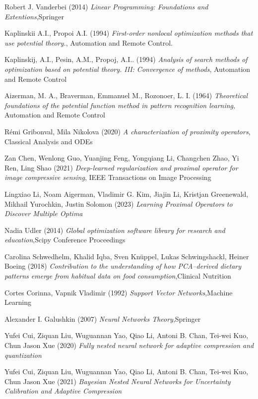 \documentclass{article} %
\begin{document}
 \begin{thebibliography}{9}
Robert J. Vanderbei (2014) \emph{ Linear Programming: Foundations and Extentions},Springer

Kaplinskii A.I., Propoi A.I. (1994) \emph{First-order nonlocal optimization methods that use potential theory.}, Automation and Remote Control. 

Kaplinskij, A.I., Pesin, A.M., Propoj, A.I.. (1994) \emph{  Analysis of search methods of optimization based on potential theory. III: Convergence of methods}, Automation and Remote Control

Aizerman, M. A., Braverman, Emmanuel M., Rozonoer, L. I. (1964) \emph{ Theoretical foundations of the potential function method in pattern recognition learning}, Automation and Remote Control

Rémi Gribonval, Mila Nikolova (2020) \emph{ A characterization of proximity operators}, Classical Analysis and ODEs

Zan Chen, Wenlong Guo, Yuanjing Feng, Yongqiang Li, Changchen Zhao, Yi Ren, Ling Shao (2021) \emph{ Deep-learned regularization and proximal operator for image compressive sensing}, IEEE Transactions on Image Processing

Lingxiao Li, Noam Aigerman, Vladimir G. Kim, Jiajin Li, Kristjan Greenewald, Mikhail Yurochkin, Justin Solomon (2023) \emph{ Learning Proximal Operators to Discover  Multiple Optima}


Nadia Udler (2014) \emph{ Global optimization software library for research and education},Scipy Conference Proceedings


Carolina Schwedhelm,  Khalid Iqba, Sven Knüppel,  Lukas Schwingshackl, Heiner Boeing (2018) \emph{ Contribution to the understanding of how PCA–derived dietary patterns emerge from habitual data on food consumption},Clinical Nutrition

Cortes Corinna, Vapnik Vladimir (1992) \emph{Support Vector Networks},Machine Learning

Alexander I. Galushkin (2007) \emph{ Neural Networks Theory},Springer

Yufei Cui, Ziquan Liu, Wuguannan Yao, Qiao Li, Antoni B. Chan, Tei-wei Kuo, Chun Jason Xue (2020) \emph{Fully nested neural network for adaptive compression and quantization}


Yufei Cui, Ziquan Liu, Wuguannan Yao, Qiao Li, Antoni B. Chan, Tei-wei Kuo, Chun Jason Xue (2021) \emph{Bayesian Nested Neural Networks for Uncertainty Calibration and Adaptive Compression}


\end{thebibliography}
\end{document}
